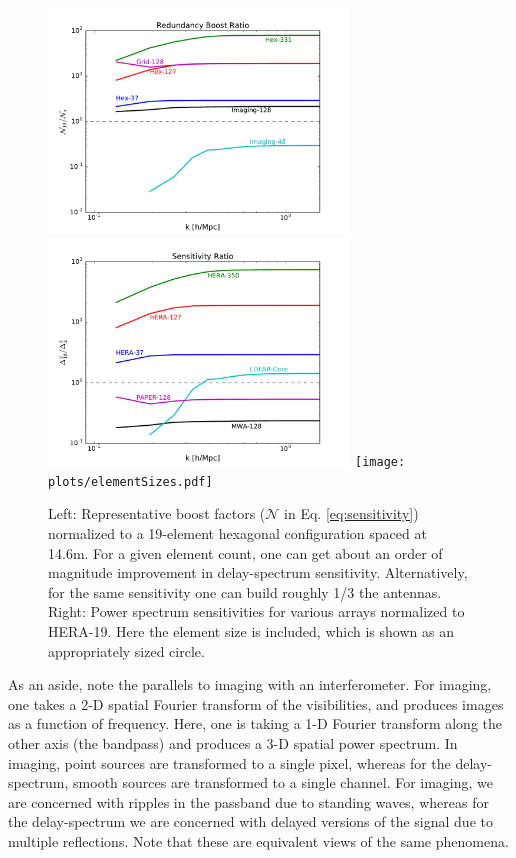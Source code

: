 \documentclass[preprint,11pt]{aastex}
\begin{document}
\begin{figure}[h!]
\centerline{
\includegraphics[height=6cm]{plots/boost.pdf}
\includegraphics[height=6cm]{plots/sensratio.pdf}
\texttt{[image: plots/elementSizes.pdf]}
}
\caption{Left: Representative boost factors ($\mathcal{N}$ in Eq. \ref{eq:sensitivity}) normalized to a 19-element hexagonal configuration spaced at 14.6m.  For a given element count, one can get about an order of
magnitude improvement in delay-spectrum sensitivity.  Alternatively, for the same sensitivity one can build roughly 1/3 the antennas.  Right:  Power spectrum sensitivities for various arrays normalized to HERA-19.  Here the element size is included, which is shown as an appropriately sized circle.}
\label{fig:boost}
\end{figure}



As an aside, note the parallels to imaging with an interferometer.  For imaging, one takes a 2-D spatial Fourier transform of the visibilities, and produces images as a function of frequency.  Here, one is taking a 1-D Fourier transform along the other axis (the bandpass) and produces a 3-D spatial power spectrum.  In imaging, point sources are transformed to a single pixel, whereas for the delay-spectrum, smooth sources are transformed to a single channel.  For imaging, we are concerned with ripples in the passband due to standing waves, whereas for the delay-spectrum we are concerned with delayed versions of the signal due to multiple reflections.  Note that these are equivalent views of the same phenomena.
\end{document}
